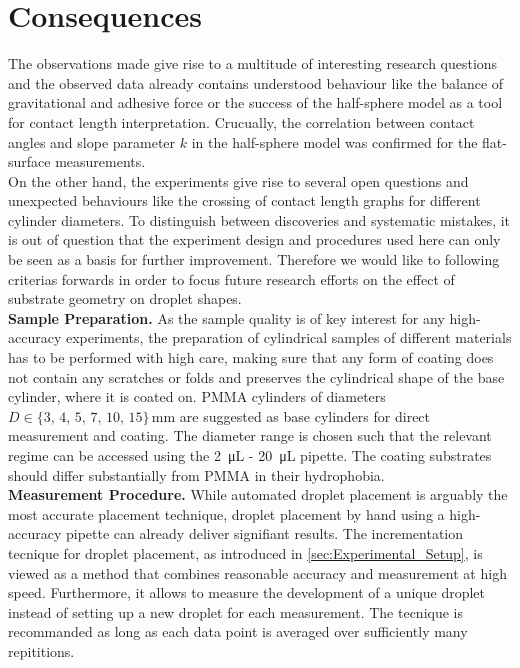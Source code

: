 
\section{Consequences}
    
    The observations made give rise to a multitude of interesting research questions and the observed data already contains understood behaviour like the balance of gravitational and adhesive force or the success of the half-sphere model  as a tool for contact length interpretation. Crucually, the correlation between contact angles and slope parameter $k$ in the half-sphere model was confirmed for the flat-surface measurements. \\

    On the other hand, the experiments give rise to several open questions and unexpected behaviours like the crossing of contact length graphs for different cylinder diameters. To distinguish between discoveries and systematic mistakes, it is out of question that the experiment design and procedures used here can only be seen as a basis for further improvement. Therefore we would like to following criterias forwards in order to focus future research efforts on the effect of substrate geometry on droplet shapes. \\ 

    \textbf{Sample Preparation.} As the sample quality is of key interest for any high-accuracy experiments, the preparation of cylindrical samples of different materials has to be performed with high care, making sure that any form of coating does not contain any scratches or folds and preserves the cylindrical shape of the base cylinder, where it is coated on. PMMA cylinders of diameters $D \in \{3,\,4,\,5,\,7,\,10,\,15\}\,\unit{\milli\meter}$ are suggested as base cylinders for direct measurement and coating. The diameter range is chosen such that the relevant regime can be accessed using the \SI{2}{\micro\liter} - \SI{20}{\micro\liter} pipette. The coating substrates should differ substantially from PMMA in their hydrophobia. \\

    \textbf{Measurement Procedure.} While automated droplet placement is arguably the most accurate placement technique, droplet placement by hand using a high-accuracy pipette can already deliver signifiant results. The incrementation tecnique for droplet placement, as introduced in \cref{sec:Experimental_Setup}, is viewed as a method that combines reasonable accuracy and measurement at high speed. Furthermore, it allows to measure the development of a unique droplet instead of setting up a new droplet for each measurement. The tecnique is recommanded as long as each data point is averaged over sufficiently many repititions. \\

